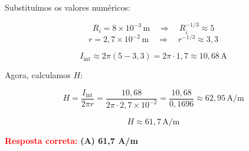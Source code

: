 \begin{flushleft}
Substituímos os valores numéricos:

\[
R_i = 8 \times 10^{-3}\,\text{m} \quad \Rightarrow \quad R_i^{-1/3} \approx 5
\]
\[
r = 2{,}7 \times 10^{-2}\,\text{m} \quad \Rightarrow \quad r^{-1/3} \approx 3{,}3
\]

\[
I_{\text{int}} \approx 2\pi (5 - 3{,}3) = 2\pi \cdot 1{,}7 \approx 10{,}68\, \text{A}
\]

Agora, calculamos \( H \):

\[
H = \frac{I_{\text{int}}}{2\pi r} = \frac{10{,}68}{2\pi \cdot 2{,}7 \times 10^{-2}} = \frac{10{,}68}{0{,}1696} \approx 62{,}95\, \text{A/m}
\]

\[
\boxed{H \approx 61{,}7\, \text{A/m}}
\]

\vspace{0.4cm}
\textcolor{red}{\textbf{Resposta correta:}} \colorbox{green!30}{\textbf{(A) 61,7 A/m}}
\end{flushleft}

